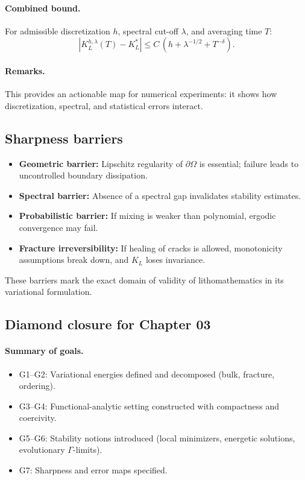 \paragraph{Combined bound.}
For admissible discretization $h$, spectral cut-off $\lambda$, and averaging time $T$:
\[
  |K_L^{h,\lambda}(T) - K_L^*| \leq C\,(h + \lambda^{-1/2} + T^{-\delta}).
\]

\paragraph{Remarks.}
This provides an actionable map for numerical experiments: it shows how discretization, spectral, and statistical errors interact.  

\subsection{Sharpness barriers}
\begin{itemize}
  \item \textbf{Geometric barrier:} Lipschitz regularity of $\partial\Omega$ is essential; failure leads to uncontrolled boundary dissipation.
  \item \textbf{Spectral barrier:} Absence of a spectral gap invalidates stability estimates.
  \item \textbf{Probabilistic barrier:} If mixing is weaker than polynomial, ergodic convergence may fail.
  \item \textbf{Fracture irreversibility:} If healing of cracks is allowed, monotonicity assumptions break down, and $K_L$ loses invariance.
\end{itemize}

These barriers mark the exact domain of validity of lithomathematics in its variational formulation.

\subsection{Diamond closure for Chapter 03}
\paragraph{Summary of goals.}
\begin{itemize}
  \item G1–G2: Variational energies defined and decomposed (bulk, fracture, ordering).
  \item G3–G4: Functional-analytic setting constructed with compactness and coercivity.
  \item G5–G6: Stability notions introduced (local minimizers, energetic solutions, evolutionary $\Gamma$-limits).
  \item G7: Sharpness and error maps specified.
\end{itemize}

